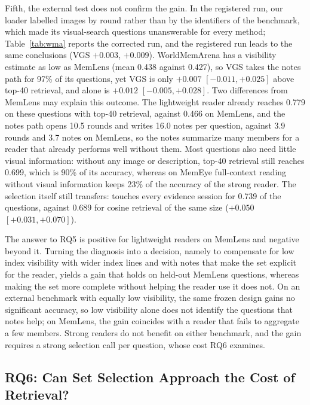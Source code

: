Fifth, the external test does not confirm the gain. In the registered run, our loader labelled images by round rather than by the identifiers of the benchmark, which made its visual-search questions unanswerable for every method; Table~\ref{tab:wma} reports the corrected run, and the registered run leads to the same conclusions (VGS $+0.003$, \qss{} $+0.009$). WorldMemArena has a visibility estimate as low as MemLens (mean 0.438 against 0.427), so VGS takes the notes path for 97\% of its questions, yet VGS is only $+0.007$ $[-0.011, +0.025]$ above top-40 retrieval, and \qss{} alone is $+0.012$ $[-0.005, +0.028]$. Two differences from MemLens may explain this outcome. The lightweight reader already reaches 0.779 on these questions with top-40 retrieval, against 0.466 on MemLens, and the notes path opens 10.5 rounds and writes 16.0 notes per question, against 3.9 rounds and 3.7 notes on MemLens, so the notes summarize many members for a reader that already performs well without them. Most questions also need little visual information: without any image or description, top-40 retrieval still reaches 0.699, which is 90\% of its accuracy, whereas on MemEye full-context reading without visual information keeps 23\% of the accuracy of the strong reader. The selection itself still transfers: \qss{} touches every evidence session for 0.739 of the questions, against 0.689 for cosine retrieval of the same size ($+0.050$ $[+0.031, +0.070]$).

The answer to RQ5 is positive for lightweight readers on MemLens and negative beyond it. Turning the diagnosis into a decision, namely to compensate for low index visibility with wider index lines and with notes that make the set explicit for the reader, yields a gain that holds on held-out MemLens questions, whereas making the set more complete without helping the reader use it does not. On an external benchmark with equally low visibility, the same frozen design gains no significant accuracy, so low visibility alone does not identify the questions that notes help; on MemLens, the gain coincides with a reader that fails to aggregate a few members. Strong readers do not benefit on either benchmark, and the gain requires a strong selection call per question, whose cost RQ6 examines.

\subsection{RQ6: Can Set Selection Approach the Cost of Retrieval?}
\label{sec:rq6}

